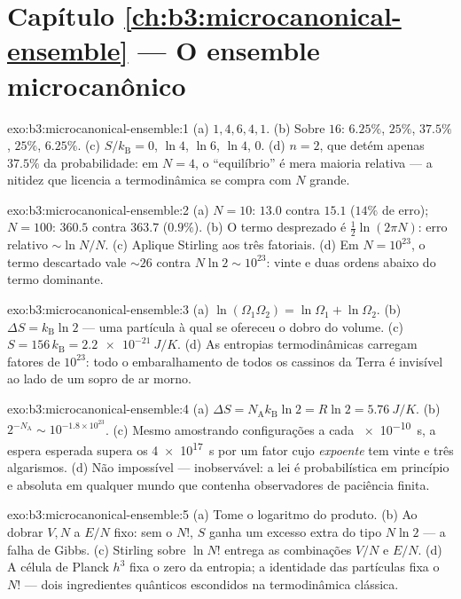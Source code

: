 \section*{Capítulo \ref{ch:b3:microcanonical-ensemble} --- O ensemble microcanônico}

\begin{solution}{exo:b3:microcanonical-ensemble:1}
(a) $1, 4, 6, 4, 1$. (b) Sobre $16$: $6.25\%$, $25\%$, $37.5\%$,
$25\%$, $6.25\%$. (c) $S/k_{\text{B}} = 0$, $\ln4$, $\ln6$, $\ln4$,
$0$. (d) $n = 2$, que detém apenas $37.5\%$ da probabilidade: em
$N = 4$, o ``equilíbrio'' é mera maioria relativa --- a nitidez que
licencia a termodinâmica se compra com $N$ grande.
\end{solution}

\begin{solution}{exo:b3:microcanonical-ensemble:2}
(a) $N = 10$: $13.0$ contra $15.1$ ($14\%$ de erro); $N = 100$:
$360.5$ contra $363.7$ ($0.9\%$). (b) O termo desprezado é
$\tfrac12\ln(2\pi N)$: erro relativo $\sim\ln N/N$. (c) Aplique
Stirling aos três fatoriais. (d) Em $N = 10^{23}$, o termo descartado
vale $\sim26$ contra $N\ln2 \sim 10^{23}$: vinte e duas ordens abaixo
do termo dominante.
\end{solution}

\begin{solution}{exo:b3:microcanonical-ensemble:3}
(a) $\ln(\Omega_1\Omega_2) = \ln\Omega_1 + \ln\Omega_2$. (b)
$\Delta S = k_{\text{B}}\ln2$ --- uma partícula à qual se ofereceu o
dobro do volume. (c) $S = 156\,k_{\text{B}} = \qty{2.2e-21}{J/K}$. (d)
As entropias termodinâmicas carregam fatores de $10^{23}$: todo o
embaralhamento de todos os cassinos da Terra é invisível ao lado de um
sopro de ar morno.
\end{solution}

\begin{solution}{exo:b3:microcanonical-ensemble:4}
(a) $\Delta S = N_{\text{A}}k_{\text{B}}\ln2 = R\ln2 =
\qty{5.76}{J/K}$. (b) $2^{-N_{\text{A}}} \sim 10^{-1.8\times
10^{23}}$. (c) Mesmo amostrando configurações a cada \qty{e-10}{s}, a
espera esperada supera os \qty{4e17}{s} por um fator cujo
\emph{expoente} tem vinte e três algarismos. (d) Não impossível ---
inobservável: a lei é probabilística em princípio e absoluta em
qualquer mundo que contenha observadores de paciência finita.
\end{solution}

\begin{solution}{exo:b3:microcanonical-ensemble:5}
(a) Tome o logaritmo do produto. (b) Ao dobrar $V, N$ a $E/N$ fixo:
sem o $N!$, $S$ ganha um excesso extra do tipo $N\ln2$ --- a falha de
Gibbs. (c) Stirling sobre $\ln N!$ entrega as combinações $V/N$ e
$E/N$. (d) A célula de Planck $h^3$ fixa o zero da entropia; a
identidade das partículas fixa o $N!$ --- dois ingredientes quânticos
escondidos na termodinâmica clássica.
\end{solution}

